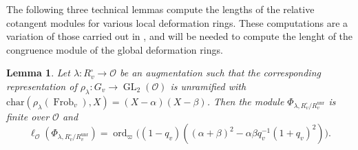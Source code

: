 \documentclass[a4paper, notitlepage, 10pt]{amsart}
\theoremstyle{plain} %
\newtheorem{lemma}[theorem]{Lemma}
\theoremstyle{definition} %
\theoremstyle{remark} %
\numberwithin{equation}{section}
\newcommand{\GL}{\operatorname{GL}} %
\newcommand{\Frob}{\operatorname{Frob}} %
\newcommand{\ord}{\operatorname{ord}} %
\newcommand{\unr}{\operatorname{unr}}
\begin{document}
The following three technical lemmas compute the lengths of the relative cotangent modules for various local deformation rings. These computations are a variation of those carried out in \cite[\S 5]{BKM2}, and will be needed to compute the lenght of the congruence module of the global deformation rings. 
\begin{lemma}\label{cotangentsquare1}
   Let $\lambda\colon R^{\square}_v\to \mathcal{O}$ be an augmentation such that the corresponding representation of $\rho_\lambda\colon G_v\to \GL_2(\mathcal{O})$ is unramified with $\mathrm{char}(\rho_\lambda(\Frob_v),X)=(X-\alpha)(X-\beta)$. Then the module $\Phi_{\lambda,R^{\square}_v/R_{v}^{\unr}}$ is finite over $\mathcal{O}$ and $$\ell_{\mathcal{O}}(\Phi_{\lambda,R^{\square}_v/R_{v}^{\unr}})=\ord_{\varpi}\big((1-q_v)((\alpha+\beta)^2-\alpha\beta q_v^{-1}(1+q_v)^2)\big).$$ 
    \end{lemma}
\end{document}
